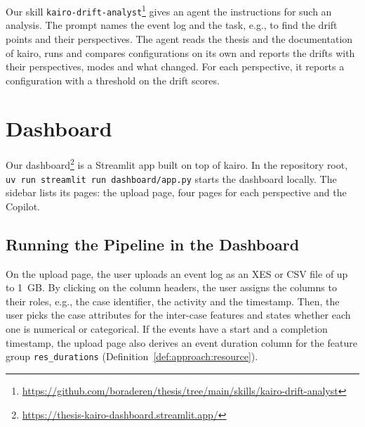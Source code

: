 Our skill \texttt{kairo-drift-analyst}\footnote{\url{https://github.com/boraderen/thesis/tree/main/skills/kairo-drift-analyst}} gives an agent the instructions for such an analysis. The prompt names the event log and the task, e.g., to find the drift points and their perspectives. The agent reads the thesis and the documentation of kairo, runs and compares configurations on its own and reports the drifts with their perspectives, modes and what changed. For each perspective, it reports a configuration with a threshold on the drift scores.

\section{Dashboard}
\label{sec:impl:dashboard}
Our dashboard\footnote{\url{https://thesis-kairo-dashboard.streamlit.app/}} is a Streamlit app built on top of kairo. In the repository root, \texttt{uv run streamlit run dashboard/app.py} starts the dashboard locally. The sidebar lists its pages: the upload page, four pages for each perspective and the Copilot.

\subsection{Running the Pipeline in the Dashboard}
\label{sec:impl:dashboard:pipeline}
On the upload page, the user uploads an event log as an XES or CSV file of up to 1~GB. By clicking on the column headers, the user assigns the columns to their roles, e.g., the case identifier, the activity and the timestamp. Then, the user picks the case attributes for the inter-case features and states whether each one is numerical or categorical. If the events have a start and a completion timestamp, the upload page also derives an event duration column for the feature group \texttt{res\_durations} (Definition~\ref{def:approach:resource}).

